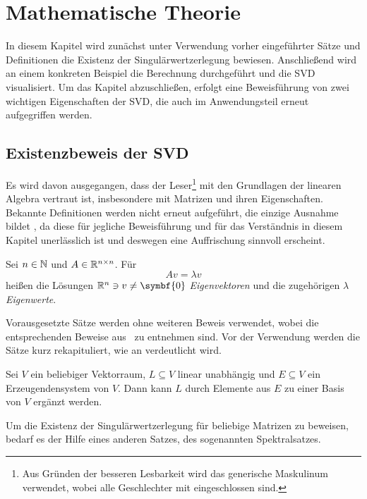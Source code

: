 \chapter{Mathematische Theorie}

In diesem Kapitel wird zunächst unter Verwendung vorher eingeführter Sätze und Definitionen die Existenz der Singulärwertzerlegung bewiesen.
Anschließend wird an einem konkreten Beispiel die Berechnung durchgeführt und die SVD visualisiert.
Um das Kapitel abzuschließen, erfolgt eine Beweisführung von zwei wichtigen Eigenschaften der SVD, die auch im Anwendungsteil erneut aufgegriffen werden.

\section{Existenzbeweis der SVD}
Es wird davon ausgegangen, dass der Leser\footnote{Aus Gründen der besseren Lesbarkeit wird das generische Maskulinum verwendet, wobei alle Geschlechter mit eingeschlossen sind.} mit den Grundlagen der linearen Algebra vertraut ist, insbesondere mit Matrizen und ihren Eigenschaften.
Bekannte Definitionen werden nicht erneut aufgeführt, die einzige Ausnahme bildet , da diese für jegliche Beweisführung und für das Verständnis in diesem Kapitel unerlässlich ist und deswegen eine Auffrischung sinnvoll erscheint.
\begin{definition}\label{eigvec}
    Sei \(n \in \mathbb{N}\) und \(A \in \mathbb{R}^{n \times n}\). Für
    \begin{equation*}
        Av=\lambda v
    \end{equation*}
    heißen die Lösungen \(\R^{n} \ni v \neq \symbf{0}\) \emph{Eigenvektoren} und die zugehörigen \(\lambda\) \emph{Eigenwerte}.   
\end{definition}
Vorausgesetzte Sätze werden ohne weiteren Beweis verwendet, wobei die entsprechenden Beweise aus~\cite{raschLineareAlgebraVersion2021} zu entnehmen sind.
Vor der Verwendung werden die Sätze kurz rekapituliert, wie an  verdeutlicht wird.
\begin{repitition}[Basisergänzungssatz]\label{bes}
    Sei \(V\) ein beliebiger Vektorraum, \(L \subseteq V\) linear unabhängig und \(E \subseteq V\) ein Erzeugendensystem von \(V\). Dann kann \(L\) durch Elemente aus \(E\) zu einer Basis von \(V\) ergänzt werden.
\end{repitition}
Um die Existenz der Singulärwertzerlegung für beliebige Matrizen zu beweisen, bedarf es der Hilfe eines anderen Satzes, des sogenannten Spektralsatzes.
